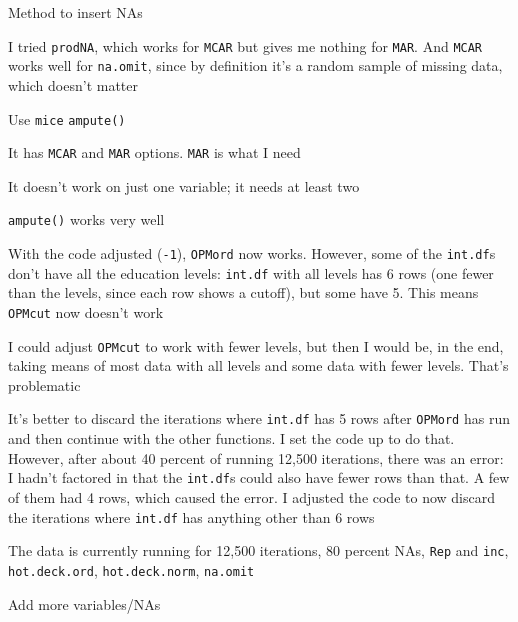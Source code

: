 \begin{coi}
\begin{coi}
\begin{coi}
					\end{coi}
			\end{coi}
		\item Method to insert NAs
			\begin{coi}
				\item I tried \texttt{prodNA}, which works for \texttt{MCAR} but gives me nothing for \texttt{MAR}. And \texttt{MCAR} works well for \texttt{na.omit}, since by definition it's a random sample of missing data, which doesn't matter 
				\item Use \texttt{mice} \texttt{ampute()}
					\begin{coi}
						\item It has \texttt{MCAR} and \texttt{MAR} options. \texttt{MAR} is what I need
						\item It doesn't work on just one variable; it needs at least two
						\item \texttt{ampute()} works very well
					\end{coi}
			\end{coi}
		\item With the code adjusted (\texttt{-1}), \texttt{OPMord} now works. However, some of the \texttt{int.df}s don't have all the education levels: \texttt{int.df} with all levels has 6 rows (one fewer than the levels, since each row shows a cutoff), but some have 5. This means \texttt{OPMcut} now doesn't work
			\begin{coi}
				\item I could adjust \texttt{OPMcut} to work with fewer levels, but then I would be, in the end, taking means of most data with all levels and some data with fewer levels. That's problematic
				\item It's better to discard the iterations where \texttt{int.df} has 5 rows after \texttt{OPMord} has run and then continue with the other functions. I set the code up to do that. However, after about 40 percent of running 12,500 iterations, there was an error: I hadn't factored in that the \texttt{int.df}s could also have fewer rows than that. A few of them had 4 rows, which caused the error. I adjusted the code to now discard the iterations where \texttt{int.df} has anything other than 6 rows
			\end{coi}
		\item The data is currently running for 12,500 iterations, 80 percent NAs, \texttt{Rep} and \texttt{inc}, \texttt{hot.deck.ord}, \texttt{hot.deck.norm}, \texttt{na.omit}
		\item Add more variables/NAs

\end{coi}

